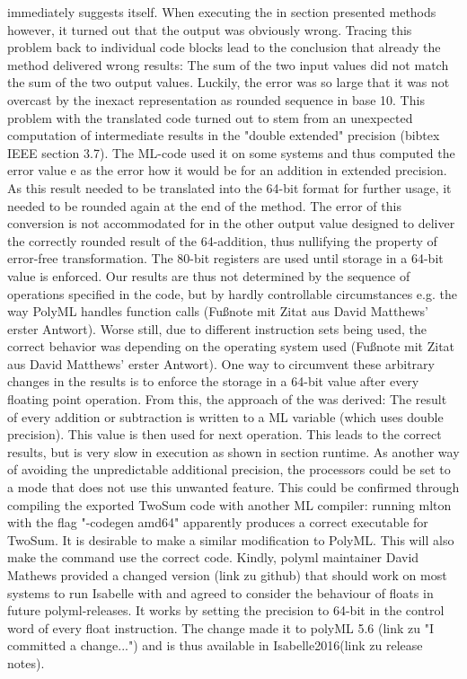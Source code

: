 \documentclass[11pt,a4paper]{article}
\begin{document}
immediately suggests itself. When executing the in section     presented methods however, it turned out that the output was obviously wrong. Tracing this problem back to individual code blocks lead to the conclusion that already the
method delivered wrong results: The sum of the two input values did not match the sum of the two output values. Luckily, the error was so large that it was not overcast by the inexact representation as rounded sequence in base 10.
This problem with the translated code turned out to stem from an unexpected computation of intermediate results in the "double extended" precision (bibtex IEEE section 3.7). The ML-code used it on some systems and thus computed the error value e as the error how it would be for an addition in extended precision. As this result needed to be translated into the 64-bit format for further usage, it needed to be rounded again at the end of the method. The error of this conversion is not accommodated for in the other output value designed to deliver the correctly rounded result of the 64-addition, thus nullifying the property of error-free transformation. The 80-bit registers are used until storage in a 64-bit value is enforced. Our results are thus not determined by the sequence of operations specified in the code, but by hardly controllable circumstances e.g. the way PolyML handles function calls (Fußnote mit Zitat aus David Matthews' erster Antwort). Worse still, due to different instruction sets being used, the correct behavior was depending on the operating system used (Fußnote mit Zitat aus David Matthews' erster Antwort). One way to circumvent these arbitrary changes in the results is to enforce the storage in a 64-bit value after every floating point operation. From this, the approach of the
was derived: The result of every addition or subtraction is written to a ML variable (which uses double precision). This value is then used for next operation. This leads to the correct results, but is very slow in execution as shown in section runtime.
As another way of avoiding the unpredictable additional precision, the processors could be set to a mode that does not use this unwanted feature. This could be confirmed through compiling the exported TwoSum code with another ML compiler: running mlton with the flag "-codegen amd64" apparently produces a correct executable for TwoSum. It is desirable to make a similar modification to PolyML. This will also make the
command use the correct code. Kindly, polyml maintainer David Mathews provided a changed version (link zu github) that should work on most systems to run Isabelle with and agreed to consider the behaviour of floats in future polyml-releases. It works by setting the precision to 64-bit in the control word of every float instruction. The change made it to polyML 5.6 (link zu "I committed a change...") and is thus available in Isabelle2016(link zu release notes).
\end{document}

